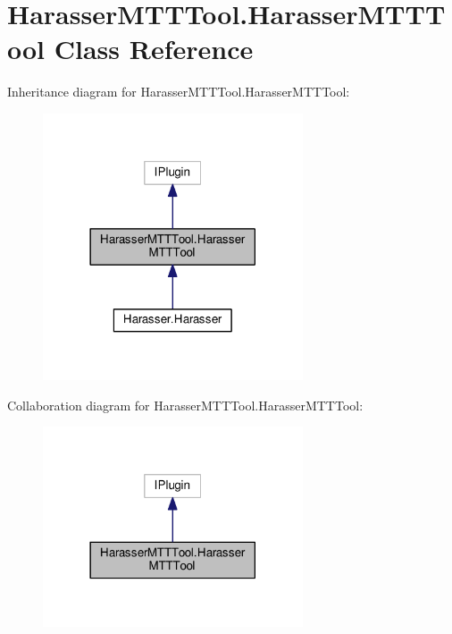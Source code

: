 \hypertarget{class_harasser_m_t_t_tool_1_1_harasser_m_t_t_tool}{\section{Harasser\-M\-T\-T\-Tool.\-Harasser\-M\-T\-T\-Tool Class Reference}
\label{class_harasser_m_t_t_tool_1_1_harasser_m_t_t_tool}
}


Inheritance diagram for Harasser\-M\-T\-T\-Tool.\-Harasser\-M\-T\-T\-Tool\-:
\nopagebreak
\begin{figure}[H]
\begin{center}
\leavevmode
\includegraphics[width=218pt]{class_harasser_m_t_t_tool_1_1_harasser_m_t_t_tool__inherit__graph}
\end{center}
\end{figure}


Collaboration diagram for Harasser\-M\-T\-T\-Tool.\-Harasser\-M\-T\-T\-Tool\-:
\nopagebreak
\begin{figure}[H]
\begin{center}
\leavevmode
\includegraphics[width=218pt]{class_harasser_m_t_t_tool_1_1_harasser_m_t_t_tool__coll__graph}
\end{center}
\end{figure}
